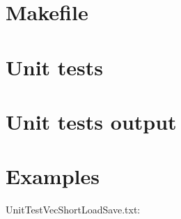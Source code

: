 \begin{scriptsize}
\begin{ttfamily}

\end{ttfamily}
\end{scriptsize}

\section{Makefile}

\begin{scriptsize}
\begin{ttfamily}

\end{ttfamily}
\end{scriptsize}

\section{Unit tests}

\begin{scriptsize}
\begin{ttfamily}

\end{ttfamily}
\end{scriptsize}

\section{Unit tests output}

\begin{scriptsize}
\begin{ttfamily}

\end{ttfamily}
\end{scriptsize}

\section{Examples}

UnitTestVecShortLoadSave.txt:\\
\begin{scriptsize}
\begin{ttfamily}

\end{ttfamily}
\end{scriptsize}

